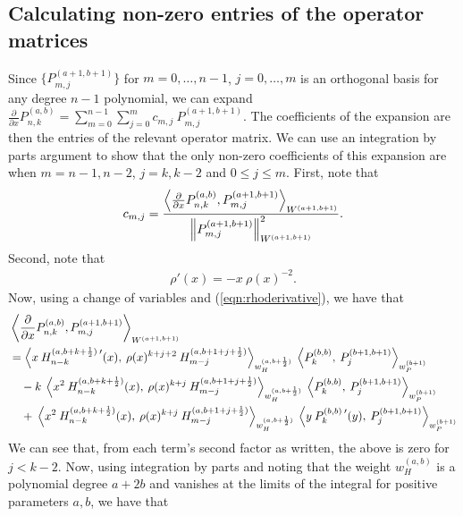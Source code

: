 \documentclass[11pt, oneside]{article}   	%
\newcommand{\half}{\frac{1}{2}}
\newcommand{\pddx}{\frac{\partial}{\partial x}}
\newcommand{\Pnkab}{P_{n,k}^{(a,b)}}
\begin{document}
\subsection{Calculating non-zero entries of the operator matrices}\label{subsection:Computation-operatormatrices}

Since $\{P^{(a+1, b+1)}_{m,j}\}$ for $m = 0,\dots,n-1$, $j = 0,\dots,m$ is an orthogonal basis for any degree $n-1$ polynomial, we can expand $\pddx \Pnkab = \sum_{m=0}^{n-1} \sum_{j=0}^m c_{m,j} \: P^{(a+1, b+1)}_{m,j}$. The coefficients of the expansion are then the entries of the relevant operator matrix. We can use an integration by parts argument to show that the only non-zero coefficients of this expansion are when $m = n-1, n-2$, $j = k, k-2$ and $0 \le j \le m$. First, note that
\begin{align*}
c_{m,j} = \frac{\ip<\pddx \Pnkab, P^{(a+1, b+1)}_{m,j} >_{W^{(a+1, b+1)}}}{\norm{P^{(a+1, b+1)}_{m,j}}^2_{W^{(a+1, b+1)}}}.
\end{align*}
Second, note that
\begin{align}
	\rho'(x) = -x \: \rho(x)^{-2}. \label{eqn:rhoderivative}
\end{align}
Now, using a change of variables and (\ref{eqn:rhoderivative}), we have that
\begin{align}
	&\ip<\pddx \Pnkab, P^{(a+1, b+1)}_{m,j} >_{W^{(a+1, b+1)}} \nonumber \\ 
	&= \ip< x \: H_{n-k}^{(a, b+k+\half) \: \prime} (x), \: \rho(x)^{k+j+2} \: H_{m-j}^{(a, b+1+j+\half)} >_{w_H^{(a, b+\half)}} 
		\: \ip< P_k^{(b,b)}, \: P_j^{(b+1,b+1)} >_{w_P^{(b+1)}}  \nonumber \\ 
	& \quad - k \: \ip< x^2 \: H_{n-k}^{(a, b+k+\half)}(x), \: \rho(x)^{k+j} \: H_{m-j}^{(a, b+1+j+\half)} >_{w_H^{(a, b+\half)}} 
		\: \ip< P_k^{(b,b)}, \: P_j^{(b+1,b+1)} >_{w_P^{(b+1)}}  \nonumber \\ 
	& \quad + \: \ip< x^2 \: H_{n-k}^{(a, b+k+\half)}(x), \: \rho(x)^{k+j} \: H_{m-j}^{(a, b+1+j+\half)} >_{w_H^{(a, b+\half)}} 
		\: \ip< y \: P_k^{(b,b) \: \prime} (y), \: P_j^{(b+1,b+1)} >_{w_P^{(b+1)}}  
\end{align}
We can see that, from each term's second factor as written, the above is zero for $j < k-2$. Now, using integration by parts and noting that the weight $w_H^{(a,b)}$ is a polynomial degree $a+2b$ and vanishes at the limits of the integral for positive parameters $a,b$, we have that
\end{document}
